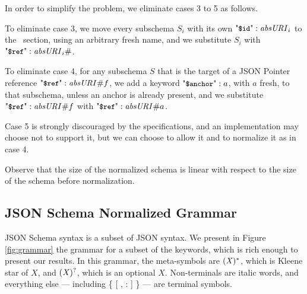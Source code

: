 {In order to simplify the problem, we eliminate cases 3 to 5 as follows.

To eliminate case 3, we move every subschema $S_i$ with its own $\qdid : \UU_i$ to the \qddefs\ section, using an arbitrary fresh name, 
and we substitute $S_i$ with $\qdref : \UU_i\#$.

To eliminate case 4, for any subschema $S$ that is the target of a JSON Pointer reference $\qdref : \UU\#f$, we add a keyword $\qda : a$, with $a$ fresh,
to that subschema, unless an anchor is already present, and we substitute $\qdref : \UU\#f$ with  $\qdref : \UU\#a$.

Case 5 is strongly discouraged by the specifications, and an implementation may choose not to support it, but we can choose to allow it and to normalize it
as in case 4.

Observe that the size of the normalized schema is linear with respect to the size of the schema before normalization.
}%

\subsection{JSON Schema Normalized Grammar}\label{sec:ordering}\label{sec:normalizedsyntax}

%

JSON Schema syntax is a subset of JSON syntax. %
We present in Figure \ref{fig:grammar} the grammar for a subset of the keywords, which is rich enough to present our
results. %
In this grammar, the meta-symbols are $(\mathit{X})^*$, which is Kleene star of $X$,
and $(\mathit{X})^?$, which is an optional $X$.
Non-terminals are italic words,
and everything else --- including \{ [ , : ] \} --- are terminal symbols.




